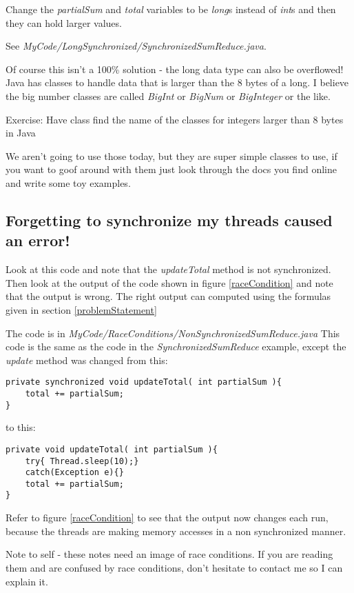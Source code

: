 \documentclass[12pt]{article}
\begin{document}
Change the \textit{partialSum} and \textit{total} variables to be \textit{long}s
instead of \textit{int}s and then they can hold larger values.

See \textit{MyCode/LongSynchronized/SynchronizedSumReduce.java}. 

Of course this isn't a 100\% solution - the long data type can also be
overflowed! Java has classes to handle data that is larger than the 8 bytes of a
long. I believe the big number classes are called \textit{BigInt} or
\textit{BigNum} or \textit{BigInteger} or the like.

{\Large Exercise: Have class find the name of the classes for integers larger
than 8 bytes in Java}

We aren't going to use those today, but they are super simple classes to use,
if you want to goof around with them just look through the docs you find online
and write some toy examples.


\subsection{Forgetting to synchronize my threads caused an error!}

Look at this code and note that the \textit{updateTotal} method is not
synchronized. Then look at the output of the code shown in figure
\ref{raceCondition}  and note that the output is wrong. The right output can
computed using the formulas given in section \ref{problemStatement}

The code is in \textit{MyCode/RaceConditions/NonSynchronizedSumReduce.java} This
code is the same as the code in the \textit{SynchronizedSumReduce} example,
except the \textit{update} method was changed from this:

\begin{lstlisting}
private synchronized void updateTotal( int partialSum ){
	total += partialSum;
}
\end{lstlisting}

to this:

\begin{lstlisting}
private void updateTotal( int partialSum ){
	try{ Thread.sleep(10);}
	catch(Exception e){}
	total += partialSum;
}
\end{lstlisting}

Refer to figure \ref{raceCondition} to see that the output now changes each run,
because the threads are making memory accesses in a non synchronized manner.

Note to self - these notes need an image of race conditions. If you are reading
them and are confused by race conditions, don't hesitate to contact me so I can
explain it.
\end{document}
